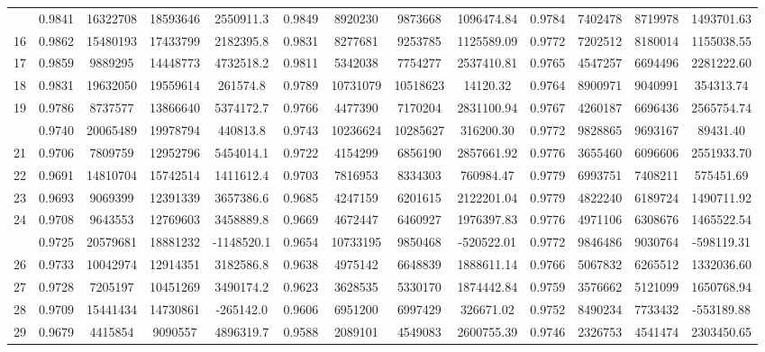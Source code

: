 \documentclass[
  12pt,
]{article}
\begin{document}
\begin{longtable}[t]{lcccccccccccc}
\addlinespace
15 & 0.9841 & 16322708 & 18593646 & 2550911.3 & 0.9849 & 8920230 & 9873668 & 1096474.84 & 0.9784 & 7402478 & 8719978 & 1493701.63\\
16 & 0.9862 & 15480193 & 17433799 & 2182395.8 & 0.9831 & 8277681 & 9253785 & 1125589.09 & 0.9772 & 7202512 & 8180014 & 1155038.55\\
17 & 0.9859 & 9889295 & 14448773 & 4732518.2 & 0.9811 & 5342038 & 7754277 & 2537410.81 & 0.9765 & 4547257 & 6694496 & 2281222.60\\
18 & 0.9831 & 19632050 & 19559614 & 261574.8 & 0.9789 & 10731079 & 10518623 & 14120.32 & 0.9764 & 8900971 & 9040991 & 354313.74\\
19 & 0.9786 & 8737577 & 13866640 & 5374172.7 & 0.9766 & 4477390 & 7170204 & 2831100.94 & 0.9767 & 4260187 & 6696436 & 2565754.74\\
\addlinespace
20 & 0.9740 & 20065489 & 19978794 & 440813.8 & 0.9743 & 10236624 & 10285627 & 316200.30 & 0.9772 & 9828865 & 9693167 & 89431.40\\
21 & 0.9706 & 7809759 & 12952796 & 5454014.1 & 0.9722 & 4154299 & 6856190 & 2857661.92 & 0.9776 & 3655460 & 6096606 & 2551933.70\\
22 & 0.9691 & 14810704 & 15742514 & 1411612.4 & 0.9703 & 7816953 & 8334303 & 760984.47 & 0.9779 & 6993751 & 7408211 & 575451.69\\
23 & 0.9693 & 9069399 & 12391339 & 3657386.6 & 0.9685 & 4247159 & 6201615 & 2122201.04 & 0.9779 & 4822240 & 6189724 & 1490711.92\\
24 & 0.9708 & 9643553 & 12769603 & 3458889.8 & 0.9669 & 4672447 & 6460927 & 1976397.83 & 0.9776 & 4971106 & 6308676 & 1465522.54\\
\addlinespace
25 & 0.9725 & 20579681 & 18881232 & -1148520.1 & 0.9654 & 10733195 & 9850468 & -520522.01 & 0.9772 & 9846486 & 9030764 & -598119.31\\
26 & 0.9733 & 10042974 & 12914351 & 3182586.8 & 0.9638 & 4975142 & 6648839 & 1888611.14 & 0.9766 & 5067832 & 6265512 & 1332036.60\\
27 & 0.9728 & 7205197 & 10451269 & 3490174.2 & 0.9623 & 3628535 & 5330170 & 1874442.84 & 0.9759 & 3576662 & 5121099 & 1650768.94\\
28 & 0.9709 & 15441434 & 14730861 & -265142.0 & 0.9606 & 6951200 & 6997429 & 326671.02 & 0.9752 & 8490234 & 7733432 & -553189.88\\
29 & 0.9679 & 4415854 & 9090557 & 4896319.7 & 0.9588 & 2089101 & 4549083 & 2600755.39 & 0.9746 & 2326753 & 4541474 & 2303450.65\\

\end{longtable}
\end{document}
